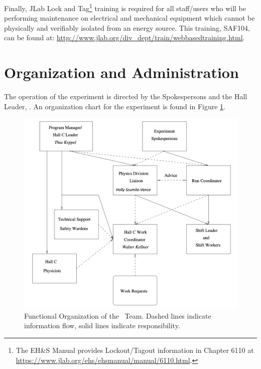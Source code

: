 \documentclass[10pt]{article}
\begin{document}
Finally, JLab Lock and Tag\footnote{The EH\&S Manual provides Lockout/Tagout
information in Chapter 6110 at \url{https://www.jlab.org/ehs/ehsmanual/manual/6110.html}.}
training is required for all staff/users who will be
performing maintenance on electrical and mechanical equipment which
cannot be physically and verifiably isolated from an energy
source.   This training, SAF104, can be found at:   \newline
\url{http://www.jlab.org/div_dept/train/webbasedtraining.html}.



\section{ Organization  and Administration}

The operation of the experiment is directed by the Spokespersons and the Hall
Leader, \HALLLEADER. An organization chart for the experiment is
found in Figure \ref{HALLCHART}.

\begin{figure}
\includegraphics[width=\textwidth]{coo_HallCorg}
%
%
%
%
\caption[Dummy caption.]{Functional Organization of the \HALL\ Team. Dashed
lines indicate information flow, solid lines indicate responsibility.}
\label{HALLCHART}
\end{figure}
\end{document}
